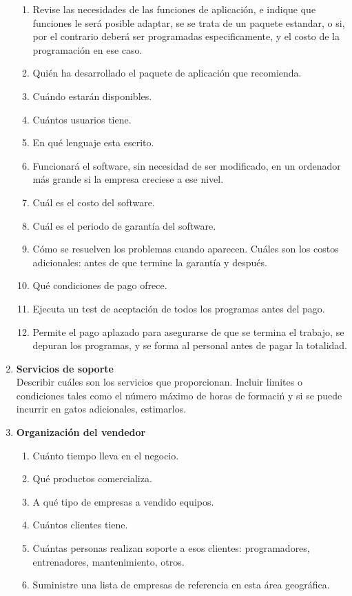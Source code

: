 \begin{enumerate}
    \begin{enumerate}
      \item Revise las necesidades de las funciones de aplicación, e indique que
funciones le será posible adaptar, se se trata de un paquete estandar, o si, por
el contrario deberá ser programadas especificamente, y el costo de la
programación en ese caso.
      \item Quién ha desarrollado el paquete de aplicación que recomienda.
      \item Cuándo estarán disponibles.
      \item Cuántos usuarios tiene.
      \item En qué lenguaje esta escrito.
      \item Funcionará el software, sin necesidad de ser modificado, en un
ordenador más grande si la empresa creciese a ese nivel.
      \item Cuál es el costo del software.
      \item Cuál es el periodo de garantía del software.
      \item Cómo se resuelven los problemas cuando aparecen. Cuáles son los
costos adicionales: antes de que termine la garantía y después.
      \item Qué condiciones de pago ofrece.
      \item Ejecuta un test de aceptación de todos los programas antes del pago.
      \item Permite el pago aplazado para asegurarse de que se termina el
trabajo, se depuran los programas, y se forma al personal antes de pagar la
totalidad.
    \end{enumerate}
  
  \item \textbf{Servicios de soporte} \\
      Describir cuáles son los servicios que proporcionan. Incluir limites o
condiciones tales como el número máximo de horas de formaciń y si se puede
incurrir en gatos adicionales, estimarlos.

  \item \textbf{Organización del vendedor}

    \begin{enumerate}
      \item Cuánto tiempo lleva en el negocio.
      \item Qué productos comercializa.
      \item A qué tipo de empresas a vendido equipos.
      \item Cuántos clientes tiene.
      \item Cuántas personas realizan soporte a esos clientes: programadores, 
entrenadores, mantenimiento, otros.
      \item Suministre una lista de empresas de referencia en esta área
geográfica.
    \end{enumerate}

\end{enumerate}